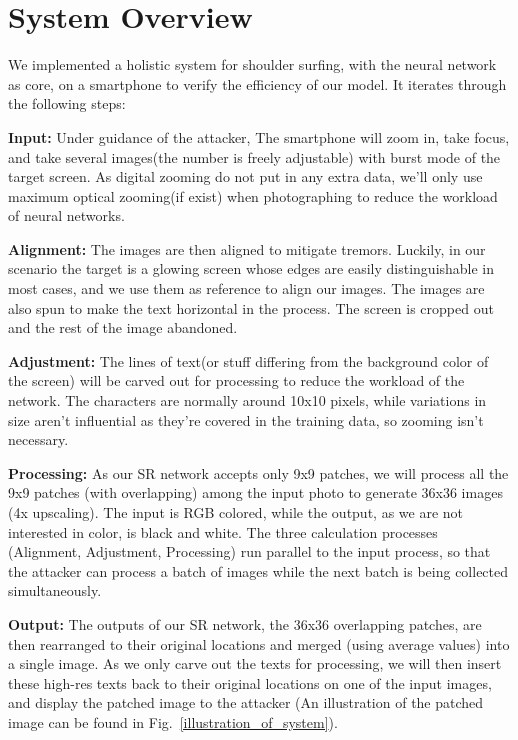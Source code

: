 \section{System Overview}
\label{sec-system-overview} 
We implemented a holistic system for shoulder surfing, with the neural network as core, on a smartphone to verify the efficiency of our model. It iterates through the following steps: 

\vspace{1mm}
\noindent
\textbf{Input:} Under guidance of the attacker, The smartphone will zoom in, take focus, and take several images(the number is freely adjustable) with burst mode of the target screen. As digital zooming do not put in any extra data, we'll only use maximum optical zooming(if exist) when photographing to reduce the workload of neural networks.

\vspace{1mm}
\noindent
\textbf{Alignment:} The images are then aligned to mitigate tremors. Luckily, in our scenario the target is a glowing screen whose edges are easily distinguishable in most cases, and we use them as reference to align our images. The images are also spun to make the text horizontal in the process. The screen is cropped out and the rest of the image abandoned.


\vspace{1mm}
\noindent
\textbf{Adjustment:} The lines of text(or stuff differing from the background color of the screen) will be carved out for processing to reduce the workload of the network. The characters are normally around 10x10 pixels, while variations in size aren't influential as they're covered in the training data, so zooming isn't necessary.

\vspace{1mm}
\noindent
\textbf{Processing:} As our SR network accepts only 9x9 patches, we will process all the 9x9 patches (with overlapping) among the input photo to generate 36x36 images (4x upscaling). The input is RGB colored, while the output, as we are not interested in color, is black and white. The three calculation processes (Alignment, Adjustment, Processing) run parallel to the input process, so that the attacker can process a batch of images while the next batch is being collected simultaneously.
		
\vspace{1mm}
\noindent
\textbf{Output:} The outputs of our SR network, the 36x36 overlapping patches, are then rearranged to their original locations and merged (using average values) into a single image. As we only carve out the texts for processing, we will then insert these high-res texts back to their original locations on one of the input images, and display the patched image to the attacker (An illustration of the patched image can be found in Fig.~\ref{illustration_of_system}).

